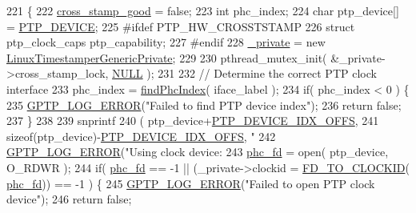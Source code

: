 \begin{DoxyCode}
221                                                            \{
222     \hyperlink{class_linux_timestamper_generic_a44ccbbc368595932d5247f158b0c902e}{cross\_stamp\_good} = \textcolor{keyword}{false};
223     \textcolor{keywordtype}{int} phc\_index;
224     \textcolor{keywordtype}{char} ptp\_device[] = \hyperlink{linux__hal__common_8hpp_a9b1e7f9349e1ec00fda261e19712cc3b}{PTP\_DEVICE};
225 \textcolor{preprocessor}{#ifdef PTP\_HW\_CROSSTSTAMP}
226     \textcolor{keyword}{struct }ptp\_clock\_caps ptp\_capability;
227 \textcolor{preprocessor}{#endif}
228     \hyperlink{class_linux_timestamper_generic_a5522acc6ce53752665fa393702058a7b}{\_private} = \textcolor{keyword}{new} \hyperlink{struct_linux_timestamper_generic_private}{LinuxTimestamperGenericPrivate};
229 
230     pthread\_mutex\_init( &\_private->cross\_stamp\_lock, \hyperlink{openavb__types__base__pub_8h_a070d2ce7b6bb7e5c05602aa8c308d0c4}{NULL} );
231 
232     \textcolor{comment}{// Determine the correct PTP clock interface}
233     phc\_index = \hyperlink{linux__hal__generic_8cpp_a58e1e630fe6789d224a9e75d84c85b53}{findPhcIndex}( iface\_label );
234     \textcolor{keywordflow}{if}( phc\_index < 0 ) \{
235         \hyperlink{gptp__log_8hpp_afefbb1009717c128012bfeed94842987}{GPTP\_LOG\_ERROR}(\textcolor{stringliteral}{"Failed to find PTP device index"});
236         \textcolor{keywordflow}{return} \textcolor{keyword}{false};
237     \}
238 
239     snprintf
240         ( ptp\_device+\hyperlink{linux__hal__common_8hpp_a1e0fb7a4341f2bb3018c116a3ad7e574}{PTP\_DEVICE\_IDX\_OFFS},
241           \textcolor{keyword}{sizeof}(ptp\_device)-\hyperlink{linux__hal__common_8hpp_a1e0fb7a4341f2bb3018c116a3ad7e574}{PTP\_DEVICE\_IDX\_OFFS}, \textcolor{stringliteral}{"%
242     \hyperlink{gptp__log_8hpp_afefbb1009717c128012bfeed94842987}{GPTP\_LOG\_ERROR}(\textcolor{stringliteral}{"Using clock device: %
243     \hyperlink{class_linux_timestamper_generic_ac4500de48048f43e4cfd225a42c8bd56}{phc\_fd} = open( ptp\_device, O\_RDWR );
244     \textcolor{keywordflow}{if}( \hyperlink{class_linux_timestamper_generic_ac4500de48048f43e4cfd225a42c8bd56}{phc\_fd} == -1 || (\_private->clockid = \hyperlink{linux__hal__common_8hpp_adbd346029ff3eefd4a09ea5c63b82449}{FD\_TO\_CLOCKID}(
      \hyperlink{class_linux_timestamper_generic_ac4500de48048f43e4cfd225a42c8bd56}{phc\_fd})) == -1 ) \{
245         \hyperlink{gptp__log_8hpp_afefbb1009717c128012bfeed94842987}{GPTP\_LOG\_ERROR}(\textcolor{stringliteral}{"Failed to open PTP clock device"});
246         \textcolor{keywordflow}{return} \textcolor{keyword}{false};
}}
\end{DoxyCode}
